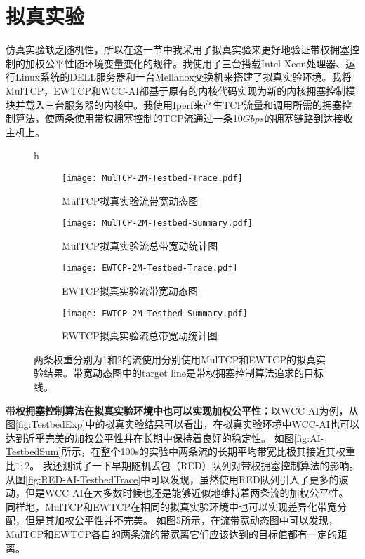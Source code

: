 \documentclass[winfonts]{njuthesis}
\begin{document}
\section{拟真实验}
\label{sec:emulation}

仿真实验缺乏随机性，所以在这一节中我采用了拟真实验来更好地验证带权拥塞控制的加权公平性随环境变量变化的规律。我使用了三台搭载Intel Xeon处理器、运行Linux系统的DELL服务器和一台Mellanox交换机来搭建了拟真实验环境。我将MulTCP，EWTCP和WCC-AI都基于原有的内核代码实现为新的内核拥塞控制模块并载入三台服务器的内核中。我使用Iperf\cite{iperf}来产生TCP流量和调用所需的拥塞控制算法，使两条使用带权拥塞控制的TCP流通过一条10$Gbps$的拥塞链路到达接收主机上。

\begin{figure}{h}
  \begin{subfigure}{.5\textwidth}
    \centering
		\texttt{[image: MulTCP-2M-Testbed-Trace.pdf]}
    \caption{MulTCP拟真实验流带宽动态图}
    \label{fig:MulTCP-2M-TestbedTrace}
  \end{subfigure}
	\begin{subfigure}{.5\textwidth}
    \centering
		\texttt{[image: MulTCP-2M-Testbed-Summary.pdf]}
    \caption{MulTCP拟真实验流总带宽动统计图}
    \label{fig:MulTCP-2M-TestbedSum}
  \end{subfigure}
  \begin{subfigure}{.5\textwidth}
    \centering
		\texttt{[image: EWTCP-2M-Testbed-Trace.pdf]}
    \caption{EWTCP拟真实验流带宽动态图}
    \label{fig:EWTCP-2M-TestbedTrace}
  \end{subfigure}
	\begin{subfigure}{.5\textwidth}
    \centering
		\texttt{[image: EWTCP-2M-Testbed-Summary.pdf]}
    \caption{EWTCP拟真实验流总带宽动统计图}
    \label{fig:EWTCP-2M-TestbedSum}
  \end{subfigure}
  \caption{两条权重分别为1和2的流使用分别使用MulTCP和EWTCP的拟真实验结果。带宽动态图中的target line是带权拥塞控制算法追求的目标线。}
  \label{fig:PreWorkTrace}
\end{figure}

\textbf{带权拥塞控制算法在拟真实验环境中也可以实现加权公平性：}以WCC-AI为例，从图\ref{fig:TestbedExp}中的拟真实验结果可以看出，在拟真实验环境中WCC-AI也可以达到近乎完美的加权公平性并在长期中保持着良好的稳定性。
如图\ref{fig:AI-TestbedSum}所示，在整个100s的实验中两条流的长期平均带宽比极其接近其权重比$1:2$。
我还测试了一下早期随机丢包（RED）队列对带权拥塞控制算法的影响。
从图\ref{fig:RED-AI-TestbedTrace}中可以发现，虽然使用RED队列引入了更多的波动，但是WCC-AI在大多数时候也还是能够近似地维持着两条流的加权公平性。
同样地，MulTCP和EWTCP在相同的拟真实验环境中也可以实现差异化带宽分配，但是其加权公平性并不完美。
如图\ref{fig:PreWorkTrace}所示，在流带宽动态图中可以发现，MulTCP和EWTCP各自的两条流的带宽离它们应该达到的目标值都有一定的距离。
\end{document}
